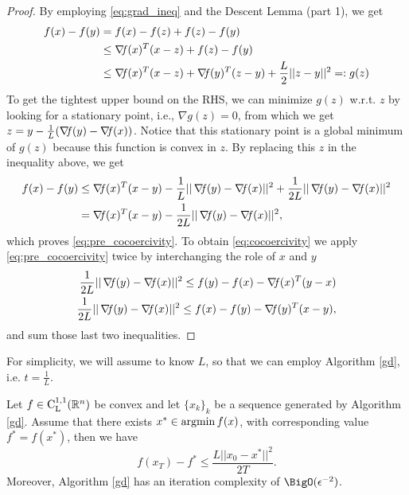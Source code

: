 \documentclass[10pt,a4paper]{article}
\begin{document}
\begin{proof}
	By employing \eqref{eq:grad_ineq} and the Descent Lemma (part 1), we get
	\begin{equation*}
		\begin{split}
			f(x) - f(y) &= f(x) - f(z) + f(z) - f(y)\\
			& \leq \operatorname*{\mathit{\nabla \!f}}(x)^T(x-z) + f(z) - f(y)\\
			&\leq \operatorname*{\mathit{\nabla \!f}}(x)^T(x-z) + \operatorname*{\mathit{\nabla \!f}}(y)^T(z-y) + \frac{L}{2}||z-y||^2=:g(z)
		\end{split}
	\end{equation*}
To get the tightest upper bound on the RHS, we can minimize $g(z)$ w.r.t. $z$ by looking for a stationary point, i.e., $\nabla g(z)=0$, from which we get $z=y - \frac{1}{L}(\operatorname*{\mathit{\nabla \!f}}(y)-\operatorname*{\mathit{\nabla \!f}}(x))$. Notice that this stationary point is a global minimum of $g(z)$ because this function is convex in $z$. By replacing this $z$ in the inequality above, we get 
\begin{equation*}
	\begin{split}
		f(x) - f(y) &\leq \grad(x)^T(x-y) -\frac{1}{L}||\grad(y)-\grad(x)||^2 + \frac{1}{2L}||\grad(y)-\grad(x)||^2\\
		&= \grad(x)^T(x-y)-\frac{1}{2L}||\grad(y)-\grad(x)||^2,
	\end{split}
\end{equation*}
which proves \eqref{eq:pre_cocoercivity}. To obtain \eqref{eq:cocoercivity} we apply \eqref{eq:pre_cocoercivity} twice by interchanging the role of $x$ and $y$
\begin{align*}
	\frac{1}{2L} ||\operatorname*{\mathit{\nabla \!f}}(y)-\operatorname*{\mathit{\nabla \!f}}(x)||^2 \leq f(y)-f(x) -\operatorname*{\mathit{\nabla \!f}}(x)^T(y-x)\\
	\frac{1}{2L} ||\operatorname*{\mathit{\nabla \!f}}(y)-\operatorname*{\mathit{\nabla \!f}}(x)||^2 \leq f(x)-f(y) -\operatorname*{\mathit{\nabla \!f}}(y)^T(x-y),
\end{align*}
and sum those last two inequalities.
\end{proof}
\noindent For simplicity, we will assume to know $L$, so that we can employ Algorithm \eqref{gd}, i.e. $t=\frac{1}{L}$.
\begin{theorem}
	Let $f\in \mathord{\mathrm{C^{1,1}_{L}}}(\mathbb{R}^n)$ be convex and let $\{x_k\}_k$ be a sequence generated by Algorithm \ref{gd}. Assume that there exists $x^*\in \operatorname*{argmin} f(x)$, with corresponding value $f^*=f(x^*)$, then we have 
	\begin{equation}\label{eq:convex_convergence}
		f(x_T)-f^* \leq \frac{L ||x_0-x^*||^2}{2T}.
	\end{equation}
	Moreover, Algorithm \ref{gd} has an iteration complexity of $\BigO(\epsilon^{-2})$.
\end{theorem}
\end{document}
